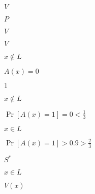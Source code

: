 \documentclass[10pt]{book}
\begin{document}
\begin{mdSnippets}
\begin{mdInlineSnippet}[5206560a306a2e085a437fd258eb57ce]
$V$\end{mdInlineSnippet}%
\begin{mdInlineSnippet}%
$P$\end{mdInlineSnippet}%
\begin{mdInlineSnippet}[5206560a306a2e085a437fd258eb57ce]%
$V$\end{mdInlineSnippet}%
\begin{mdInlineSnippet}[5206560a306a2e085a437fd258eb57ce]%
$V$\end{mdInlineSnippet}%
\begin{mdInlineSnippet}[8e681b85e2ea0786a5bcdc939df91b34]%
$x \notin L$\end{mdInlineSnippet}%
\begin{mdInlineSnippet}[67e85b27d3c2717711c4d6ebb8fc3229]%
$A(x) = 0$\end{mdInlineSnippet}%
\begin{mdInlineSnippet}[c4ca4238a0b923820dcc509a6f75849b]%
$1$\end{mdInlineSnippet}%
\begin{mdInlineSnippet}[8e681b85e2ea0786a5bcdc939df91b34]%
$x \notin L$\end{mdInlineSnippet}%
\begin{mdInlineSnippet}[9323d3936e335444496b7110bc783b65]%
$\Pr[A(x) = 1] = 0 < \frac{1}{3}$\end{mdInlineSnippet}%
\begin{mdInlineSnippet}[7788b409a9b3225cf8aecc6149a2bd2e]%
$x \in L$\end{mdInlineSnippet}%
\begin{mdInlineSnippet}%
$\Pr[A(x) = 1] > 0.9 > \frac{2}{3}$\end{mdInlineSnippet}%
\begin{mdInlineSnippet}[c4317e7a89e36bc1b16822e61435ddfc]%
$S^*$\end{mdInlineSnippet}%
\begin{mdInlineSnippet}[7788b409a9b3225cf8aecc6149a2bd2e]%
$x \in L$\end{mdInlineSnippet}%
\begin{mdInlineSnippet}[7da3f9417e349bc472da3b128413cd70]%
$V(x)$\end{mdInlineSnippet}%

\end{mdSnippets}
\end{document}
